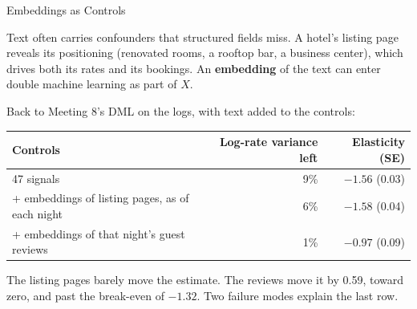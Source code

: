 \documentclass[aspectratio=169, 11pt, handout]{beamer}
\begin{document}
\begin{frame}{Embeddings as Controls}

Text often carries confounders that structured fields miss. A hotel's listing page reveals its positioning (renovated rooms, a rooftop bar, a business center), which drives both its rates and its bookings. An \textbf{embedding} of the text can enter double machine learning as part of $X$.

\bigskip

Back to Meeting 8's DML on the logs, with text added to the controls:

\begin{center}
\small
\begin{tabular}{lrr}
\toprule
\textbf{Controls} & \textbf{Log-rate variance left} & \textbf{Elasticity (SE)} \\
\midrule
47 signals & 9\% & $-1.56$ (0.03) \\
+ embeddings of listing pages, as of each night & 6\% & $-1.58$ (0.04) \\
+ embeddings of that night's guest reviews & 1\% & $-0.97$ (0.09) \\
\bottomrule
\end{tabular}
\end{center}

\medskip

The listing pages barely move the estimate. The reviews move it by 0.59, toward zero, and past the break-even of $-1.32$. Two failure modes explain the last row.
\end{frame}
\end{document}
